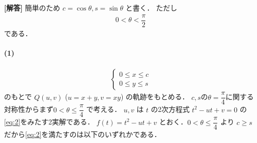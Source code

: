 \documentclass[../../main.tex]{subfiles}
\begin{document}
\begin{oframed}
  
\end{oframed}

{\bf [解答]}
簡単のため $c=\cos\theta, s=\sin\theta$ と書く．
ただし
\begin{align}
  0 < \theta < \dfrac{\pi}{2} \label{eq:1}
\end{align}
である．

\paragraph{(1)}
\begin{align}
  \begin{cases}
    0\le x\le c \\
    0\le y\le s
  \end{cases} \label{eq:2}
\end{align}
のもとで $Q(u,v)$ ($u=x+y, v=xy$) の軌跡をもとめる．
$c, s$の$\theta=\dfrac{\pi}{4}$に関する対称性からまず$0<\theta\le\dfrac{\pi}{4}$ で考える．
$u,v$ は $t$ の2次方程式 $t^2-ut+v=0$ の\cref{eq:2}をみたす2実解である．
$f(t)=t^2-ut+v$ とおく．$0<\theta\le\dfrac{\pi}{4}$ より $c\ge s$ だから\cref{eq:2}を満たすのは以下のいずれかである．
\end{document}
